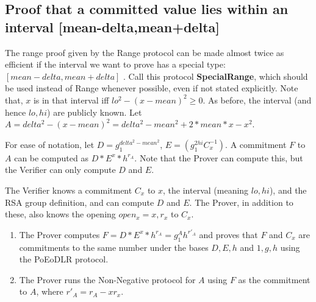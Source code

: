 \subsection{Proof that a committed value lies within an interval [mean-delta,mean+delta]}

The range proof given by the Range protocol can be made almost twice as efficient if the interval we want to prove has a special type: $[mean-delta,mean+delta]$ \cite{chlCOMPACT}. Call this protocol \textbf{SpecialRange}, which should be used instead of Range whenever possible, even if not stated explicitly. Note that, $x$ is in that interval iff $lo^2 - (x-mean)^2 \geq 0$. As before, the interval (and hence $lo,hi$) are publicly known. Let $A = delta^2 - (x-mean)^2 = delta^2 - mean^2 + 2*mean*x - x^2$.

For ease of notation, let $D = g_{1}^{delta^2 - mean^2}$, $E = (g_{1}^{2hi} C_{x}^{-1})$. A commitment $F$ to $A$ can be computed as $D * E^x * h^{r_A}$. Note that the Prover can compute this, but the Verifier can only compute $D$ and $E$.


The Verifier knows a commitment $C_x$ to $x$, the interval (meaning $lo,hi$), and the RSA group definition, and can compute $D$ and $E$. The Prover, in addition to these, also knows the opening $open_x = x,r_x$ to $C_x$.


\begin{enumerate}
 \item The Prover computes $F = D * E^x * h^{r_A} = g_{1}^{A} h^{r'_A}$ and proves that $F$ and $C_x$ are commitments to the same number under the bases $D,E,h$ and $1,g,h$ using the PoEoDLR protocol.
 \item The Prover runs the Non-Negative protocol for $A$ using $F$ as the commitment to $A$, where $r'_A = r_A - x r_x$.
\end{enumerate}
